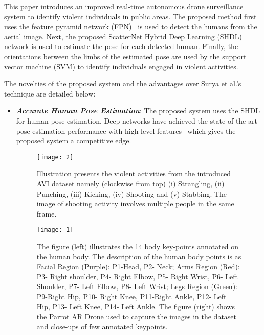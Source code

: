 \documentclass[10pt,twocolumn,letterpaper]{article}
\begin{document}
This paper introduces an improved real-time autonomous drone surveillance system to identify violent individuals in public areas. The proposed method first uses the feature pyramid network (FPN)~\cite{hd} is used to detect the humans from the aerial image. Next, the proposed ScatterNet Hybrid Deep Learning (SHDL) network is used to estimate the pose for each detected human. Finally, the orientations between the limbs of the estimated pose are used by the support vector machine (SVM) to identify individuals engaged in violent activities. 

The novelties of the proposed system and the advantages over Surya et al.'s~\cite{penmetsa2014autonomous} technique are detailed below: 

\begin{itemize}
	\setlength\itemsep{-0.35em}
\item \textbf{\textit{Accurate Human Pose Estimation}}: The proposed system uses the SHDL for human pose estimation. Deep networks have achieved the state-of-the-art pose estimation performance with high-level features~\cite{li20143d, pfister2014deep, toshev2014deeppose} which gives the proposed system a competitive edge.

\begin{figure}[t]
	\begin{center}
		\texttt{[image: 2]}
	\end{center}
	\caption{\small{Illustration presents the violent activities from the introduced AVI dataset namely (clockwise from top) (i) Strangling,
			(ii) Punching, (iii) Kicking, (iv) Shooting and (v) Stabbing. The image of shooting activity involves multiple people in the same frame.}}
	\label{fig:long}
	\label{fig:onecol}
\end{figure}

\begin{figure}[t]
	\begin{center}
		\texttt{[image: 1]}
	\end{center}
	\caption{\small{The figure (left) illustrates the 14 body key-points annotated on the human body. The description of the human body points is as Facial Region (Purple): P1-Head, P2- Neck; Arms Region (Red): P3- Right shoulder, P4- Right Elbow, P5- Right Wrist, P6- Left Shoulder, P7- Left Elbow, P8- Left Wrist; Legs Region (Green): P9-Right Hip, P10- Right Knee, P11-Right Ankle, P12- Left Hip, P13- Left Knee, P14- Left Ankle. The figure (right) shows the Parrot AR Drone used to capture the images in the dataset and close-ups of few annotated keypoints.}}
	\label{fig:long}
	\label{fig:onecol}
\end{figure}


\end{itemize}
\end{document}
